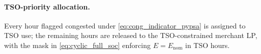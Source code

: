 
 
\paragraph{TSO-priority allocation.} Every hour flagged congested under \eqref{eq:cong_indicator_pypsa} is assigned to TSO use; the remaining hours are released to the TSO-constrained merchant LP, with the mask in \eqref{eq:cyclic_full_soc} enforcing $E = E_{\mathrm{nom}}$ in TSO hours.
 
  
 
